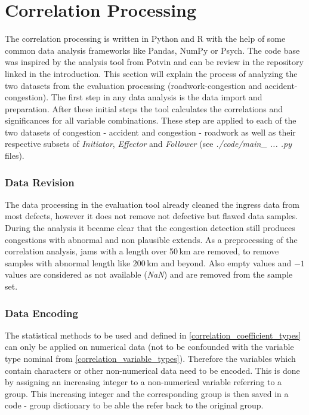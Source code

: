 \section{Correlation Processing}
\label{methodology_correlation_processing}
The correlation processing is written in Python and R with the help of some common data analysis frameworks like Pandas, NumPy or Psych. The code base was inspired by the analysis tool from Potvin \parencite{Potvin2020} and can be review in the repository linked in the introduction. This section will explain the process of analyzing the two datasets from the evaluation processing (roadwork-congestion and accident-congestion). The first step in any data analysis is the data import and preparation. After these initial steps the tool calculates the correlations and significances for all variable combinations. These step are applied to each of the two datasets of congestion - accident and congestion - roadwork as well as their respective subsets of \textit{Initiator}, \textit{Effector} and \textit{Follower} (see \textit{./code/main\_ ... .py} files).

\subsubsection{Data Revision}
\label{methodology_correlation_processing_revision}
The data processing in the evaluation tool already cleaned the ingress data from most defects, however it does not remove not defective but flawed data samples. During the analysis it became clear that the congestion detection still produces congestions with abnormal and non plausible extends. As a preprocessing of the correlation analysis, jams with a length over 50\,km are removed, to remove samples with abnormal length like 200\,km and beyond. Also empty values and $-1$ values are considered as not available (\textit{NaN}) and are removed from the sample set.

\subsubsection{Data Encoding}
\label{methodology_correlation_processing_encoding}
The statistical methods to be used and defined in \cref{correlation_coefficient_types} can only be applied on numerical data (not to be confounded with the variable type nominal from \cref{correlation_variable_types}). Therefore the variables which contain characters or other non-numerical data need to be encoded. This is done by assigning an increasing integer to a non-numerical variable referring to a group. This increasing integer and the corresponding group is then saved in a code - group dictionary to be able the refer back to the original group.

